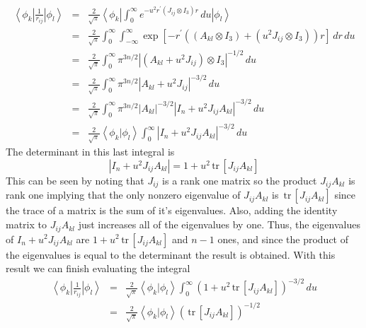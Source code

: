 \documentclass[12pt,thmsa,suthesis,verbatim]{report}
\begin{document}
\begin{eqnarray}
\left\langle \phi _k\right| \frac 1{r_{ij}}\left| \phi _l\right\rangle
&=&\frac 2{\sqrt{\pi }}\left\langle \phi _k\right| \int_0^\infty
e^{-u^2r^{\prime }\left( J_{ij}\otimes I_3\right) r}\,du\left| \phi
_l\right\rangle  \nonumber \\
\ &=&\frac 2{\sqrt{\pi }}\int_0^\infty \int_{-\infty }^\infty \exp \left[
-r^{\prime }\left( \left( A_{kl}\otimes I_3\right) +\left( u^2J_{ij}\otimes
I_3\right) \right) r\right] \,dr\,du  \nonumber \\
\ &=&\frac 2{\sqrt{\pi }}\int_0^\infty \pi ^{3n/2}\left| \left(
A_{kl}+u^2J_{ij}\right) \otimes I_3\right| ^{-1/2}\,du  \nonumber \\
\ &=&\frac 2{\sqrt{\pi }}\int_0^\infty \pi ^{3n/2}\left|
A_{kl}+u^2J_{ij}\right| ^{-3/2}\,du  \nonumber \\
\ &=&\frac 2{\sqrt{\pi }}\int_0^\infty \pi ^{3n/2}\left| A_{kl}\right|
^{-3/2}\left| I_n+u^2J_{ij}A_{kl}\right| ^{-3/2}\,du  \nonumber \\
\ &=&\frac 2{\sqrt{\pi }}\left\langle \phi _k\right. |\left. \phi
_l\right\rangle \int_0^\infty \left| I_n+u^2J_{ij}A_{kl}\right| ^{-3/2}\,du
\end{eqnarray}
The determinant in this last integral is 
\begin{equation}
\left| I_n+u^2J_{ij}A_{kl}\right| =1+u^2\,\mathrm{tr}\,\left[
J_{ij}A_{kl}\right]
\end{equation}
This can be seen by noting that $J_{ij}$ is a rank one matrix so the product 
$J_{ij}A_{kl}$ is rank one implying that the only nonzero eigenvalue of $%
J_{ij}A_{kl}$ is $\,\mathrm{tr}\,\left[ J_{ij}A_{kl}\right] $ since the
trace of a matrix is the sum of it's eigenvalues. Also, adding the identity
matrix to $J_{ij}A_{kl}$ just increases all of the eigenvalues by one. Thus,
the eigenvalues of $I_n+u^2J_{ij}A_{kl}$ are $1+u^2\,\mathrm{tr}\,\left[
J_{ij}A_{kl}\right] $ and $n-1$ ones, and since the product of the
eigenvalues is equal to the determinant the result is obtained. With this
result we can finish evaluating the integral 
\begin{eqnarray}
\left\langle \phi _k\right| \frac 1{r_{ij}}\left| \phi _l\right\rangle
&=&\frac 2{\sqrt{\pi }}\left\langle \phi _k\right. |\left. \phi
_l\right\rangle \int_0^\infty \left( 1+u^2\,\mathrm{tr}\,\left[
J_{ij}A_{kl}\right] \right) ^{-3/2}\,du  \nonumber \\
&=&\frac 2{\sqrt{\pi }}\left\langle \phi _k\right. |\left. \phi
_l\right\rangle \left( \,\mathrm{tr}\,\left[ J_{ij}A_{kl}\right] \right)
^{-1/2}
\end{eqnarray}
\end{document}
